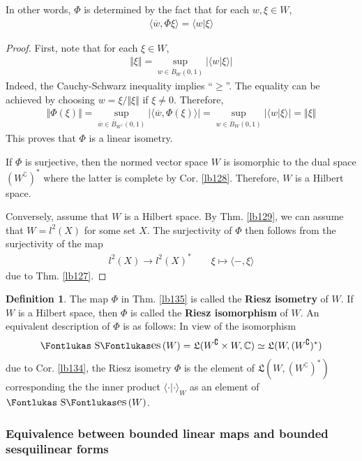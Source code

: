 \documentclass[12pt,b5paper,notitlepage]{article}
\theoremstyle{definition}
\newtheorem{df}{Definition}[subsection]
\theoremstyle{plain}
\DeclareMathOperator{\Ses}{\text{\Fontlukas S}\text{\kern -0pt {\Fontlukas\large es}}\,}
\newcommand{\fk}{\mathfrak}
\newcommand{\ovl}{\overline}
\newcommand{\bk}[1]{\langle {#1}\rangle}
\newcommand{\Co}{\complement}
\newcommand{\Cbb}{\mathbb C}
\numberwithin{equation}{section}
\begin{document}
In other words, $\Phi$ is determined by the fact that for each $w,\xi\in W$, 
\begin{align}
\bk{\ovl w,\Phi\xi}=\bk{w|\xi}
\end{align}


\begin{proof}
First, note that for each $\xi\in W$,
\begin{align}
\Vert\xi\Vert=\sup_{w\in\ovl B_W(0,1)}|\bk{w|\xi}|
\end{align}
Indeed, the Cauchy-Schwarz inequality implies ``$\geq$''. The equality can be achieved by choosing $w=\xi/\Vert\xi\Vert$ if $\xi\neq0$. Therefore,
\begin{align*}
\Vert\Phi(\xi)\Vert=\sup_{\ovl w\in\ovl B_{W^\Co}(0,1)}|\bk{\ovl w,\Phi(\xi)}|=\sup_{w\in\ovl B_W(0,1)}|\bk{w|\xi}|=\Vert\xi\Vert
\end{align*}
This proves that $\Phi$ is a linear isometry.

If $\Phi$ is surjective, then the normed vector space $W$ is isomorphic to the dual space $(W^\Co)^*$ where the latter is complete by Cor. \ref{lb128}. Therefore, $W$ is a Hilbert space.

Conversely, assume that $W$ is a Hilbert space. By Thm. \ref{lb129}, we can assume that $W=l^2(X)$ for some set $X$. The surjectivity of $\Phi$ then follows from the surjectivity of the map
\begin{align*}
l^2(X)\rightarrow l^2(X)^*\qquad \xi\mapsto \bk{-,\xi}
\end{align*}
due to Thm. \ref{lb127}.
\end{proof}


\begin{df}
The map $\Phi$ in Thm. \ref{lb135} is called the \textbf{Riesz isometry} of $W$. If $W$ is a Hilbert space, then $\Phi$ is called the \textbf{Riesz isomorphism} of $W$.  An equivalent description of $\Phi$ is as follows: In view of the isomorphism
\begin{align*}
\Ses(W)=\fk L(W^\Co\times W,\Cbb)\simeq\fk L(W,(W^\Co)^*)
\end{align*}
due to Cor. \ref{lb134}, the Riesz isometry $\Phi$ is the element of $\fk L(W,(W^\Co)^*)$ corresponding the the inner product $\bk{\cdot|\cdot}_W$ as an element of $\Ses(W)$.
\end{df}


\subsubsection{Equivalence between bounded linear maps and bounded sesquilinear forms}
\end{document}
